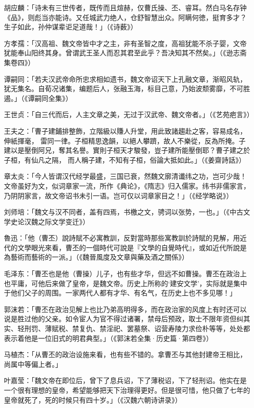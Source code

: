 胡应麟：「诗未有三世传者，既传而且煊赫，仅曹氏操、丕、睿耳。然白马名存钟《品》，则彪当亦能诗。又任城武力绝人，仓舒智慧出众。阿瞒何徳，挺育多才？生子如此，孙仲谋辈讵足道哉！」（《诗薮》）

方孝孺：「汉高祖、魏文帝皆中才之主，非有圣智之度，高祖犹能不杀子婴，文帝犹能奉山阳终其身。曾谓武王圣人而忍其君至此乎？吾决知其不然矣。」（《逊志斋集卷四》）

谭嗣同：「若夫汉武帝命所忠求相如遗书，魏文帝诏天下上孔融文章，渐昭风轨，犹无集名。自荀况诸集，编题后人，张融玉海，标目己意，乃始波颓雾靡，不可胜遏。」（《谭嗣同全集》）

王世贞：「自三代而后，人主文章之美，无过于汉武帝、魏文帝者。」（《艺苑疤言》）

王夫之：「曹子建鋪排整飾，立階級以賺人升堂，用此致諸趨赴之客，容易成名，伸紙揮毫， 雷同一律。子桓精思逸韻，以絕人攀躋，故人不樂從，反為所掩。子建以是壓倒阿兄，奪其名譽。實則子桓天才駿發，豈子建所能壓倒耶？曹子建之於子桓，有仙凡之隔， 而人稱子建，不知有子桓，俗論大抵如此。」（《姜齋詩話》）

章太炎：「今人皆谓汉代经学最盛，三国已衰，然魏文廓清谶纬之功，岂可少哉！文帝虽好为文，似词章家一流，所作《典论》，《隋志》归入儒家。纬书非儒家言，乃阴阴家言，故文帝诏书未引一语。岂可仅以词章家目之！」（《经学略说》）

刘师培：「魏文与汉不同者，盖有四焉，书檄之文，骋词以张势，一也。」（《中古文学史论汉魏之际文学变迁》）

魯迅：「他（曹丕）說詩賦不必寓教訓，反對當時那些寓教訓於詩賦的見解，用近代的文學眼光來看，曹丕的一個時代可說是『文學的自覺時代』，或如近代所說是為藝術而藝術的一派。」（《魏晉風度及文章與藥及酒之關係》）

毛泽东：「曹丕也是他（曹操）儿子，也有些才华，但远不如曹操。曹丕在政治上也平庸，可他后来做了皇帝，是魏文帝。历史上所称的‘建安文学’，实际就是集中于他们父子的周围。一家两代人都有才华、有名气，在历史上也不多见哪！」

郭沫若：「曹丕在政治见解上也比乃弟高明得多，而在政治家的风度上有时还可以说是胜过他的父亲。如令宦人为官不得过诸署，禁母后预政，取士不限年资但纠其实、轻刑罚、薄赋税、禁复仇、禁淫祀、罢墓祭、诏营寿陵力求俭朴等等，处处都表示着他是一位旧式的明君典型。」（《郭沫若全集·历史篇·第四卷》）

马植杰：「从曹丕的政治设施来看，也有些不错的。拿曹丕与其他封建帝王相比，尚属中等偏上者。」

叶嘉莹：「魏文帝在即位后，曾下了息兵诏，下了薄税诏，下了轻刑诏。他实在是一个很有理想的皇帝，希望能够把天下治理得更好。但是很可惜，他只做了七年的皇帝就死了，死的时候只有四十岁。」（《汉魏六朝诗讲录》）

